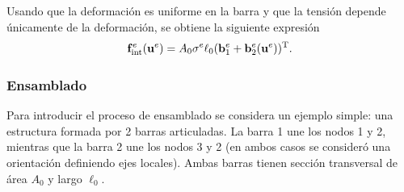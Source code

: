 Usando que la deformación es uniforme en la barra y que la tensión depende únicamente de la deformación, se obtiene la siguiente expresión 
%
\begin{equation}
\bff_{\text{int}}^e(\bfu^e) %
%
= A_0 \sigma^e  \ell_0  (\bfb_1^e +  \bfb_{2}^e(\bfu^e) )^{\text{T}}.
\end{equation}


%

\subsubsection{Ensamblado} \label{sec:ensamblado}

Para introducir el proceso de ensamblado se considera un ejemplo simple: una estructura formada por 2 barras articuladas. %
%
La barra 1 une los nodos 1 y 2, mientras que la barra 2 une los nodos 3 y 2 (en ambos casos se consideró una orientación definiendo ejes locales). %
%
Ambas barras tienen sección transversal de área $A_0$ y largo $\ell_0$. %


